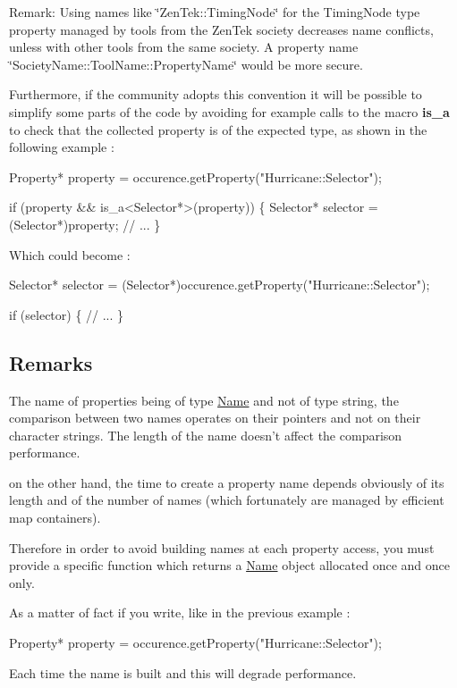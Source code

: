 \begin{DoxyParagraph}{Remark\-:}
Using names like \char`\"{}\-Zen\-Tek\-::\-Timing\-Node\char`\"{} for the Timing\-Node type property managed by tools from the Zen\-Tek society decreases name conflicts, unless with other tools from the same society. A property name \char`\"{}\-Society\-Name\-::\-Tool\-Name\-::\-Property\-Name\char`\"{} would be more secure.
\end{DoxyParagraph}
Furthermore, if the community adopts this convention it will be possible to simplify some parts of the code by avoiding for example calls to the macro {\bfseries is\-\_\-a} to check that the collected property is of the expected type, as shown in the following example \-: 
\begin{DoxyCode}
Property* \textcolor{keyword}{property} = occurence.getProperty(\textcolor{stringliteral}{"Hurricane::Selector"});
 
\textcolor{keywordflow}{if} (property && is\_a<Selector*>(property)) \{
  Selector* selector = (Selector*)property;
  \textcolor{comment}{// ...}
\}
\end{DoxyCode}
 Which could become \-: 
\begin{DoxyCode}
Selector* selector = (Selector*)occurence.getProperty(\textcolor{stringliteral}{"Hurricane::Selector"});
 
\textcolor{keywordflow}{if} (selector) \{
  \textcolor{comment}{// ...}
\}
\end{DoxyCode}
\hypertarget{classHurricane_1_1Property_secPropertyRemarks}{}\subsection{Remarks}\label{classHurricane_1_1Property_secPropertyRemarks}
The name of properties being of type \hyperlink{classHurricane_1_1Name}{Name} and not of type string, the comparison between two names operates on their pointers and not on their character strings. The length of the name doesn't affect the comparison performance.

on the other hand, the time to create a property name depends obviously of its length and of the number of names (which fortunately are managed by efficient map containers).

Therefore in order to avoid building names at each property access, you must provide a specific function which returns a \hyperlink{classHurricane_1_1Name}{Name} object allocated once and once only.

As a matter of fact if you write, like in the previous example \-: 
\begin{DoxyCode}
Property* \textcolor{keyword}{property} = occurence.getProperty(\textcolor{stringliteral}{"Hurricane::Selector"});
\end{DoxyCode}
 Each time the name is built and this will degrade performance.

